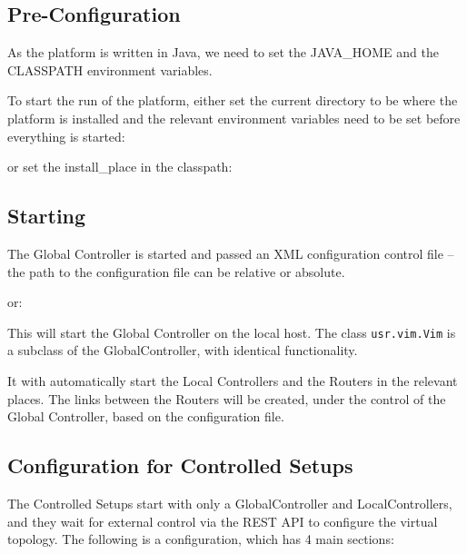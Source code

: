 \subsection{Pre-Configuration}

As the platform is
written in Java, we need to set the JAVA\_HOME and the CLASSPATH
environment variables.


\noindent To start the run of the platform, either set the current directory
to be where the platform is installed and the relevant environment variables
need to be set before everything is started:



\noindent or set the install\_place in the classpath:


\subsection{Starting}

The Global Controller is started and passed an XML
configuration control file -- the path to the configuration file can
be relative or absolute. 


\noindent or:


\noindent This will start the Global Controller on the local host.
The class \texttt{usr.vim.Vim} is a subclass of the GlobalController,
with identical functionality.

It with automatically start the Local Controllers and the Routers in the
relevant places.  The links between the Routers will be created, under
the control of the Global Controller, based on the configuration file.



\subsection{Configuration for Controlled Setups}

The Controlled Setups start with only a GlobalController and
LocalControllers, and they wait for external control via the REST API
to configure the virtual topology.
The following is a configuration, which has 4 main sections:

